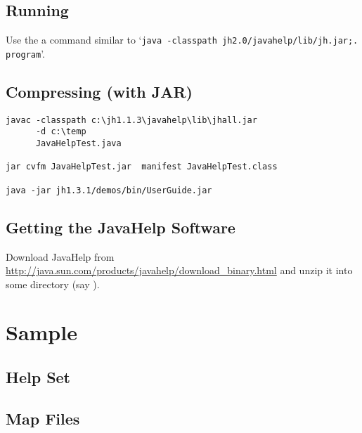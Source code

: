 \subsection{Running}

\def\RUN{java -classpath \JHDIR jh2.0/javahelp/lib/jh.jar;. program}

Use the a command similar to  `{\tt \RUN}'.

\subsection{Compressing (with JAR)}





\begin{verbatim}
javac -classpath c:\jh1.1.3\javahelp\lib\jhall.jar
      -d c:\temp
      JavaHelpTest.java 

jar cvfm JavaHelpTest.jar  manifest JavaHelpTest.class

java -jar jh1.3.1/demos/bin/UserGuide.jar 
\end{verbatim}






\subsection{Getting the JavaHelp Software}


Download JavaHelp from 
      \url{http://java.sun.com/products/javahelp/download_binary.html}
and unzip it into some directory (say {\tt \JHDIR}).


\section{Sample}

\subsection{Help Set}



\subsection{Map Files}


